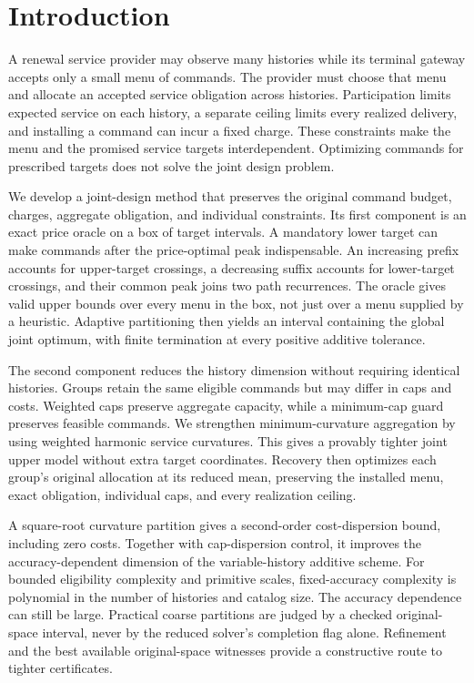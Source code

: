 \section{Introduction}
A renewal service provider may observe many histories while its terminal gateway accepts only a small menu of commands. The provider must choose that menu and allocate an accepted service obligation across histories. Participation limits expected service on each history, a separate ceiling limits every realized delivery, and installing a command can incur a fixed charge. These constraints make the menu and the promised service targets interdependent. Optimizing commands for prescribed targets does not solve the joint design problem.

We develop a joint-design method that preserves the original command budget, charges, aggregate obligation, and individual constraints. Its first component is an exact price oracle on a box of target intervals. A mandatory lower target can make commands after the price-optimal peak indispensable. An increasing prefix accounts for upper-target crossings, a decreasing suffix accounts for lower-target crossings, and their common peak joins two path recurrences. The oracle gives valid upper bounds over every menu in the box, not just over a menu supplied by a heuristic. Adaptive partitioning then yields an interval containing the global joint optimum, with finite termination at every positive additive tolerance.

The second component reduces the history dimension without requiring identical histories. Groups retain the same eligible commands but may differ in caps and costs. Weighted caps preserve aggregate capacity, while a minimum-cap guard preserves feasible commands. We strengthen minimum-curvature aggregation by using weighted harmonic service curvatures. This gives a provably tighter joint upper model without extra target coordinates. Recovery then optimizes each group's original allocation at its reduced mean, preserving the installed menu, exact obligation, individual caps, and every realization ceiling.

A square-root curvature partition gives a second-order cost-dispersion bound, including zero costs. Together with cap-dispersion control, it improves the accuracy-dependent dimension of the variable-history additive scheme. For bounded eligibility complexity and primitive scales, fixed-accuracy complexity is polynomial in the number of histories and catalog size. The accuracy dependence can still be large. Practical coarse partitions are judged by a checked original-space interval, never by the reduced solver's completion flag alone. Refinement and the best available original-space witnesses provide a constructive route to tighter certificates.

